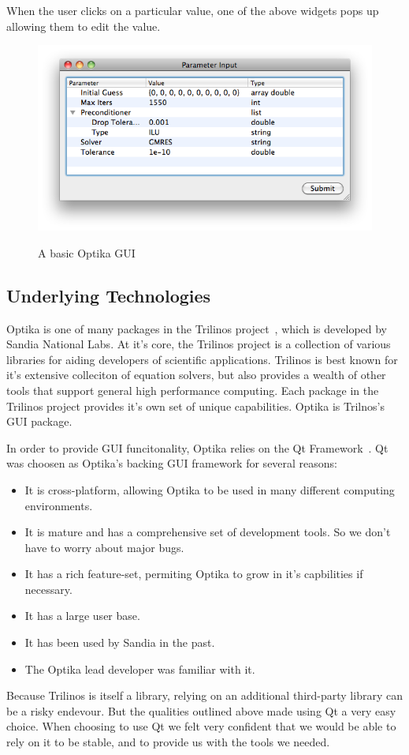 When the user clicks on a particular value, one of the above widgets pops up allowing them to edit the value.
  \begin{figure}
  \centering
  \includegraphics[scale=0.5]{graphics/basic_example}
  \label{basicexample}
  \caption[Basic GUI]{A basic Optika GUI}
  \end{figure} 
\subsection{Underlying Technologies}
Optika is one of many packages in the Trilinos project~\cite{trilinos}, which is developed by Sandia National Labs. At it's core, 
the Trilinos project is a collection of various
libraries for aiding developers of scientific applications. Trilinos is best known for it's extensive colleciton of equation solvers,
but also provides a wealth of other tools that support general high performance computing. Each package in the Trilinos project provides
it's own set of unique capabilities. Optika is Trilnos's GUI package.

In order to provide GUI funcitonality, Optika relies on the Qt Framework~\cite{Qt}. 
Qt was choosen as Optika's backing GUI framework for several
reasons:
	\begin{itemize}
		\item It is cross-platform, allowing Optika to be used in many different computing environments.
		\item It is mature and has a comprehensive set of development tools. So we don't have to worry about major bugs.
		\item It has a rich feature-set, permiting Optika to grow in it's capbilities if necessary.
    \item It has a large user base.
		\item It has been used by Sandia in the past.
		\item The Optika lead developer was familiar with it.
	\end{itemize}
Because Trilinos is itself a library, relying on an additional third-party library can be a risky endevour. But
the qualities outlined above made using Qt a very easy choice. When choosing to use Qt we felt very confident that we 
would be able to rely on it to be stable, and to provide us with the tools we needed.

